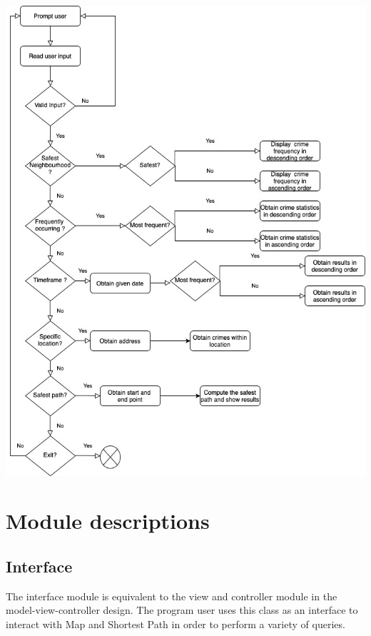 \documentclass[12pt]{article}
\begin{document}
\includegraphics[scale = 0.60]{InterfaceUML.jpg}

\section* {Module descriptions}

\subsection*{Interface}
The interface module is equivalent to the view and controller module in the model-view-controller design. The program user uses this class as an interface to interact with Map and Shortest Path in order to perform a variety of queries.
\end{document}
